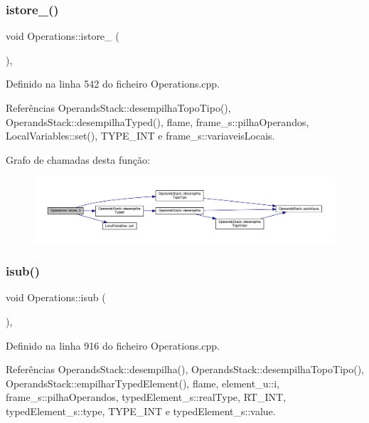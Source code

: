 \subsubsection{\texorpdfstring{istore\+\_()}{istore\_3()}}
{\footnotesize\ttfamily void Operations\+::istore\+\_ (\begin{DoxyParamCaption}{ }\end{DoxyParamCaption})\hspace{0.3cm}{\ttfamily [static]}, {\ttfamily [private]}}



Definido na linha 542 do ficheiro Operations.\+cpp.



Referências Operands\+Stack\+::desempilha\+Topo\+Tipo(), Operands\+Stack\+::desempilha\+Typed(), flame, frame\+\_\+s\+::pilha\+Operandos, Local\+Variables\+::set(), T\+Y\+P\+E\+\_\+\+I\+NT e frame\+\_\+s\+::variaveis\+Locais.

Grafo de chamadas desta função\+:
\nopagebreak
\begin{figure}[H]
\begin{center}
\leavevmode
\includegraphics[width=350pt]{classOperations_a3ff20f0475eaaa28501ea330074f5cb7_cgraph}
\end{center}
\end{figure}
\mbox{\label{classOperations_ab2808e99336de64fefb2a9073bc251de}} 
\subsubsection{\texorpdfstring{isub()}{isub()}}
{\footnotesize\ttfamily void Operations\+::isub (\begin{DoxyParamCaption}{ }\end{DoxyParamCaption})\hspace{0.3cm}{\ttfamily [static]}, {\ttfamily [private]}}



Definido na linha 916 do ficheiro Operations.\+cpp.



Referências Operands\+Stack\+::desempilha(), Operands\+Stack\+::desempilha\+Topo\+Tipo(), Operands\+Stack\+::empilhar\+Typed\+Element(), flame, element\+\_\+u\+::i, frame\+\_\+s\+::pilha\+Operandos, typed\+Element\+\_\+s\+::real\+Type, R\+T\+\_\+\+I\+NT, typed\+Element\+\_\+s\+::type, T\+Y\+P\+E\+\_\+\+I\+NT e typed\+Element\+\_\+s\+::value.

